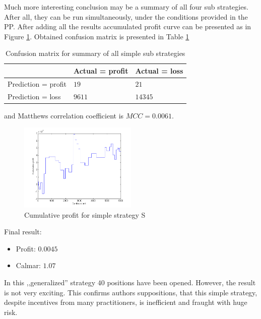 \documentclass{jtacs}
\begin{document}
Much more interesting conclusion may be a summary of all four sub strategies. After all, they can be run simultaneously, under the conditions provided in the PP. After adding all the results accumulated profit curve can be presented as in Figure \ref{rys7}. Obtained confusion matrix is presented in Table \ref{tab5}
\begin{table}[ht]
\centering
\caption{Confusion matrix for summary of all simple sub strategies}
\label{tab5}
\begin{tabular}{|l|l|l|}\hline
&	Actual = profit	& Actual = loss\\ \hline
Prediction = profit & $19$	& $21$ \\ \hline
Prediction = loss &	$9611$ &	$14345$ \\ \hline
\end{tabular}
\end{table}
\FloatBarrier
\noindent and Matthews correlation coefficient is $MCC=0.0061$.
\begin{figure}[ht]
\centering
\includegraphics[width = 0.5\textwidth]{pictures/PivotPointsSp.png}
\caption{Cumulative profit for simple strategy S}
\label{rys7}
\end{figure}
\FloatBarrier
\noindent Final result:
\begin{itemize}
\item Profit: $0.0045$
\item Calmar: $1.07$
\end{itemize}

In this ,,generalized'' strategy $40$ positions have been opened. However, the result is not very exciting. This confirms authors suppositions, that this simple strategy, despite incentives from many practitioners, is inefficient and fraught with huge risk.\\
\end{document}
